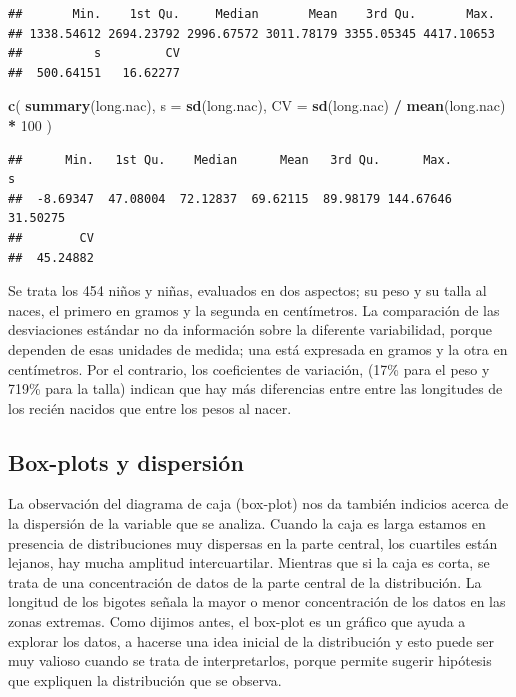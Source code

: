 \documentclass[]{book}
\newenvironment{Shaded}{\begin{snugshade}}{\end{snugshade}}
\newcommand{\DataTypeTok}[1]{\textcolor[rgb]{0.13,0.29,0.53}{#1}}
\newcommand{\DecValTok}[1]{\textcolor[rgb]{0.00,0.00,0.81}{#1}}
\newcommand{\KeywordTok}[1]{\textcolor[rgb]{0.13,0.29,0.53}{\textbf{#1}}}
\newcommand{\NormalTok}[1]{#1}
\newcommand{\OperatorTok}[1]{\textcolor[rgb]{0.81,0.36,0.00}{\textbf{#1}}}
\newcommand{\StringTok}[1]{\textcolor[rgb]{0.31,0.60,0.02}{#1}}
\begin{document}
\begin{verbatim}
##       Min.    1st Qu.     Median       Mean    3rd Qu.       Max. 
## 1338.54612 2694.23792 2996.67572 3011.78179 3355.05345 4417.10653 
##          s         CV 
##  500.64151   16.62277
\end{verbatim}

\begin{Shaded}
\begin{Highlighting}[]
\KeywordTok{c}\NormalTok{(}
  \KeywordTok{summary}\NormalTok{(long.nac),}
  \DataTypeTok{s =} \KeywordTok{sd}\NormalTok{(long.nac),}
  \DataTypeTok{CV =} \KeywordTok{sd}\NormalTok{(long.nac) }\OperatorTok{/}\StringTok{ }\KeywordTok{mean}\NormalTok{(long.nac) }\OperatorTok{*}\StringTok{ }\DecValTok{100}
\NormalTok{)}
\end{Highlighting}
\end{Shaded}

\begin{verbatim}
##      Min.   1st Qu.    Median      Mean   3rd Qu.      Max.         s 
##  -8.69347  47.08004  72.12837  69.62115  89.98179 144.67646  31.50275 
##        CV 
##  45.24882
\end{verbatim}

Se trata los 454 niños y niñas, evaluados en dos aspectos; su
peso y su talla al naces, el primero en gramos y la segunda en centímetros. La comparación de las desviaciones estándar no da
información sobre la diferente variabilidad, porque dependen de esas
unidades de medida; una está expresada en gramos y la otra en centímetros. Por el contrario, los coeficientes de variación,
(17\% para el peso y 719\% para la talla) indican que hay más
diferencias entre entre las longitudes de los recién nacidos que entre los pesos al nacer.

\hypertarget{box-plots-y-dispersiuxf3n}{%
\subsection{Box-plots y dispersión}\label{box-plots-y-dispersiuxf3n}}

La observación del diagrama de caja (box-plot) nos da también indicios acerca de la dispersión de la variable que se analiza. Cuando la caja es larga estamos en presencia de distribuciones muy dispersas en la parte central, los cuartiles están lejanos, hay mucha amplitud intercuartilar.
Mientras que si la caja es corta, se trata de una concentración de datos
de la parte central de la distribución. La longitud de los bigotes
señala la mayor o menor concentración de los datos en las zonas
extremas. Como dijimos antes, el box-plot es un gráfico que ayuda a
explorar los datos, a hacerse una idea inicial de la distribución y esto puede ser muy valioso cuando se trata de interpretarlos, porque permite sugerir hipótesis que expliquen la distribución que se observa.
\end{document}
